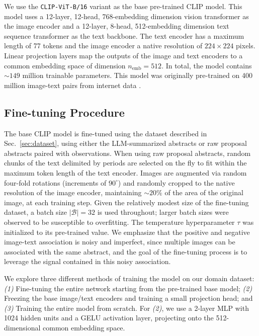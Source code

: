 \documentclass[10pt]{article} %
\begin{document}
We use the \texttt{CLIP-ViT-B/16} \citep{radford2021learning} variant as the base pre-trained CLIP model.
%
This model uses a 12-layer, 12-head, 768-embedding dimension vision transformer as the image encoder and a 12-layer, 8-head, 512-embedding dimension text sequence transformer as the text backbone.
%
The text encoder has a maximum length of 77 tokens and the image encoder a native resolution of $224\times224$ pixels.
%
Linear projection layers map the outputs of the image and text encoders to a common embedding space of dimension $n_\text{emb}=512$.
%
In total, the model contains $\sim 149$ million trainable parameters.
%
This model was originally pre-trained on 400 million image-text pairs from internet data \citep{radford2021learning}.
%

\subsection{Fine-tuning Procedure}

The base CLIP model is fine-tuned using the dataset described in Sec.~\ref{sec:dataset}, using either the LLM-summarized abstracts or raw proposal abstracts paired with observations.
%
When using raw proposal abstracts, random chunks of the text delimited by periods are selected on the fly to fit within the maximum token length of the text encoder.
%
Images are augmented via random four-fold rotations (increments of $90^\circ$) and randomly cropped to the native resolution of the image encoder, maintaining $\sim 20\%$ of the area of the original image, at each training step.
%
Given the relatively modest size of the fine-tuning dataset, a batch size $|\mathcal B| = 32$ is used throughout; larger batch sizes were observed to be susceptible to overfitting.
%
The temperature hyperparameter $\tau$ was initialized to its pre-trained value.
%
We emphasize that the positive and negative image-text association is noisy and imperfect, since multiple images can be associated with the same abstract, and the goal of the fine-tuning process is to leverage the signal contained in this noisy association. 

We explore three different methods of training the model on our domain dataset: \emph{(1)} Fine-tuning the entire network starting from the pre-trained base model; \emph{(2)} Freezing the base image/text encoders and training a small projection head; and \emph{(3)} Training the entire model from scratch.
%
For \emph{(2)}, we use a 2-layer MLP with 1024 hidden units and a GELU activation layer, projecting onto the 512-dimensional common embedding space.
\end{document}
